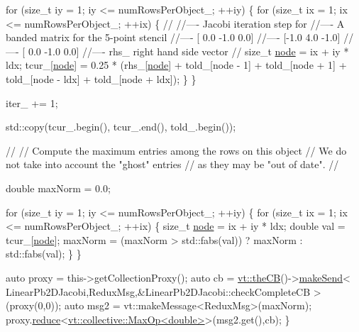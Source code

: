\begin{DoxyCodeInclude}
    \textcolor{keywordflow}{for} (\textcolor{keywordtype}{size\_t} iy = 1; iy <= numRowsPerObject\_; ++iy) \{
      \textcolor{keywordflow}{for} (\textcolor{keywordtype}{size\_t} ix = 1; ix <= numRowsPerObject\_; ++ix) \{
        \textcolor{comment}{//}
        \textcolor{comment}{//---- Jacobi iteration step for}
        \textcolor{comment}{//---- A banded matrix for the 5-point stencil}
        \textcolor{comment}{//---- [ 0.0  -1.0   0.0]}
        \textcolor{comment}{//---- [-1.0   4.0  -1.0]}
        \textcolor{comment}{//---- [ 0.0  -1.0   0.0]}
        \textcolor{comment}{//---- rhs\_ right hand side vector}
        \textcolor{comment}{//}
        \textcolor{keywordtype}{size\_t} \hyperlink{namespacevt_1_1config_a46e57c33bee1b9f1fa95455af86d80e0a576033c81e2ddd03d721ecef3b1b3f81}{node} = ix + iy * ldx;
        tcur\_[\hyperlink{namespacevt_1_1config_a46e57c33bee1b9f1fa95455af86d80e0a576033c81e2ddd03d721ecef3b1b3f81}{node}] = 0.25 * (rhs\_[\hyperlink{namespacevt_1_1config_a46e57c33bee1b9f1fa95455af86d80e0a576033c81e2ddd03d721ecef3b1b3f81}{node}]
                              + told\_[node - 1] + told\_[node + 1]
                              + told\_[node - ldx] + told\_[node + ldx]);
      \}
    \}

    iter\_ += 1;

    std::copy(tcur\_.begin(), tcur\_.end(), told\_.begin());

    \textcolor{comment}{//}
    \textcolor{comment}{// Compute the maximum entries among the rows on this object}
    \textcolor{comment}{// We do not take into account the "ghost" entries}
    \textcolor{comment}{// as they may be "out of date".}
    \textcolor{comment}{//}

    \textcolor{keywordtype}{double} maxNorm = 0.0;

    \textcolor{keywordflow}{for} (\textcolor{keywordtype}{size\_t} iy = 1; iy <= numRowsPerObject\_; ++iy) \{
      \textcolor{keywordflow}{for} (\textcolor{keywordtype}{size\_t} ix = 1; ix <= numRowsPerObject\_; ++ix) \{
        \textcolor{keywordtype}{size\_t} \hyperlink{namespacevt_1_1config_a46e57c33bee1b9f1fa95455af86d80e0a576033c81e2ddd03d721ecef3b1b3f81}{node} = ix + iy * ldx;
        \textcolor{keywordtype}{double} val = tcur\_[\hyperlink{namespacevt_1_1config_a46e57c33bee1b9f1fa95455af86d80e0a576033c81e2ddd03d721ecef3b1b3f81}{node}];
        maxNorm = (maxNorm > std::fabs(val)) ? maxNorm : std::fabs(val);
      \}
    \}

    \textcolor{keyword}{auto} proxy = this->getCollectionProxy();
    \textcolor{keyword}{auto} cb = \hyperlink{namespacevt_a673b109e94c7bca58313504c83e1da94}{vt::theCB}()->\hyperlink{structvt_1_1pipe_1_1_pipe_manager_a73583be6260418b13ee66e56cdade2da}{makeSend}<
      LinearPb2DJacobi,ReduxMsg,&LinearPb2DJacobi::checkCompleteCB
    >(proxy(0,0));
    \textcolor{keyword}{auto} msg2 = vt::makeMessage<ReduxMsg>(maxNorm);
    proxy.\hyperlink{structvt_1_1objgroup_1_1proxy_1_1_proxy_a61273d407174fb496b4aed10ec6650bd}{reduce}<\hyperlink{structvt_1_1collective_1_1reduce_1_1operators_1_1_max_op}{vt::collective::MaxOp<double>}>(msg2.get(),cb);
  \}


\end{DoxyCodeInclude}

